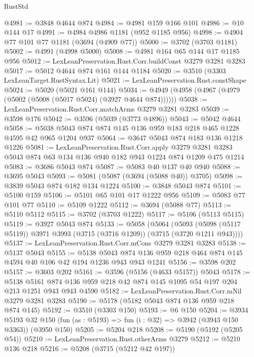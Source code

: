 \begin{lexlean}{RustStd}
\begin{coremodule}
@4981 := @3848 @4644 @874
@4984 := @4981 @159 @166 @101
@4986 := @10 @144 @17
@4991 := @4984 @4986 @1181 (@952 @1185 @956)
@4998 := @4904 @77 @101 @77 @1181 (@3694 (@4909 @77))
@5000 := @3702 (@3703 @1181)
@5002 := @4991 (@4998 @5000)
@5008 := @4981 @164 @65 @144 @17 @1185 @956
@5012 := LexLeanPreservation.Rust.Corr.buildConst @3279 @3281 @3283
@5017 := @5012 @4644 @874 @161 @144 @1184
@5020 := @3510 (@3303 LexLeanTarget.RustSyntax.Lit)
@5021 := LexLeanPreservation.Rust.constShape
@5024 := @5020 (@5021 @161 @144)
@5034 := @4949 (@4958 (@4967 (@4979 (@5002 (@5008 (@5017 @5024) (@3927 @4644 @874))))))
@5038 := LexLeanPreservation.Rust.Corr.matchArms @3279 @3281 @3283
@5039 := @3598 @176
@5042 := @3596 (@5039 (@3773 @4896))
@5043 := @5042 @4644
@5058 := @5038 @5043 @874 @874 @145 @136 @959 @183 @218 @465 @1228 @4595 @42 @965 @1204 @937
@5064 := @3647 @5043 @874 @183 @136 @1218 @1226
@5081 := LexLeanPreservation.Rust.Corr.apply
    @3279
    @3281
    @3283
    @5043
    @874
    @63
    @134
    @136
    @940
    @182
    @943
    @1224
    @874
    @1209
    @475
    @1214
@5083 := @3686 @5043 @874
@5087 := @5083 @40 @137 @40 @940
@5088 := @3695 @5043
@5093 := @5081 (@5087 (@3694 (@5088 @40)) @3705)
@5098 := @3839 @5043 @874 @182 @134 @1224
@5100 := @3848 @5043 @874
@5101 := @5100 @159
@5106 := @5101 @65 @101 @17 @1222 @956
@5109 := @5083 @77 @101 @77
@5110 := @5109 @1222
@5112 := @3694 (@5088 @77)
@5113 := @5110 @5112
@5115 := @3702 (@3703 @1222)
@5117 := @5106 (@5113 @5115)
@5119 := @3927 @5043 @874
@5133 := @5058
    (@5064
      (@5093 (@5098 (@5117 @5119)) @3971 @3993 (@3715 (@3716 @1209)) (@3715 (@3720 @1211 @943))))
@5137 := LexLeanPreservation.Rust.Corr.mCons @3279 @3281 @3283
@5138 := @5137 @5043
@5155 := @5138
    @5043
    @874
    @136
    @959
    @218
    @464
    @874
    @145
    @4594
    @40
    @106
    @42
    @194
    @1236
    @943
    @943
    @1241
@5156 := @3598 @202
@5157 := @3603 @202
@5161 := @3596 (@5156 (@4633 @5157)) @5043
@5178 := @5138
    @5161
    @874
    @136
    @959
    @218
    @42
    @874
    @145
    @1095
    @54
    @197
    @204
    @213
    @1251
    @943
    @943
    @4590
@5182 := LexLeanPreservation.Rust.Corr.mNil @3279 @3281 @3283
@5190 := @5178 (@5182 @5043 @874 @136 @959 @218 @874 @145)
@5192 := @3510 (@3303 @150)
@5193 := @6 @150
@5204 := @3934
    @5193
    @32
    @150
    (fun (as : @5193) => fun (i : @32) => @3942 (@3943 @150 @3363))
    (@3950 @150)
@5205 := @5204 @218
@5208 := @5190 (@5192 (@5205 @54))
@5210 := LexLeanPreservation.Rust.otherArms @3279
@5212 := @5210 @136 @218
@5216 := @5208 (@3715 (@5212 @42 @197))

\end{coremodule}
\end{lexlean}
